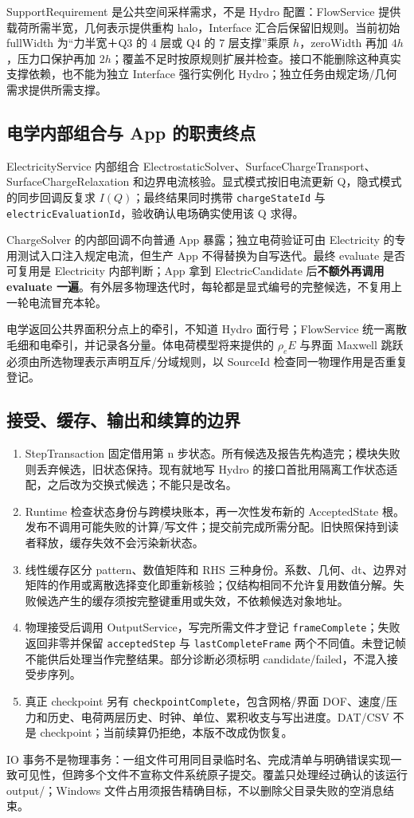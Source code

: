 \documentclass[UTF8,a4paper,11pt,fontset=fandol]{ctexart}
\numberwithin{equation}{section}
\newcommand{\code}[1]{\nolinkurl{#1}}
\begin{document}
SupportRequirement 是公共空间采样需求，不是 Hydro 配置：FlowService 提供载荷所需半宽，几何表示提供重构 halo，Interface 汇合后保留旧规则。当前初始 fullWidth 为“力半宽＋Q3 的 4 层或 Q4 的 7 层支撑”乘原 $h$，zeroWidth 再加 $4h$，压力口保护再加 $2h$；覆盖不足时按原规则扩展并检查。接口不能删除这种真实支撑依赖，也不能为独立 Interface 强行实例化 Hydro；独立任务由规定场/几何需求提供所需支撑。

\subsection{电学内部组合与 App 的职责终点}
ElectricityService 内部组合 ElectrostaticSolver、SurfaceChargeTransport、SurfaceChargeRelaxation 和边界电流核验。显式模式按旧电流更新 Q，隐式模式的同步回调反复求 $I(Q)$；最终结果同时携带 \code{chargeStateId} 与 \code{electricEvaluationId}，验收确认电场确实使用该 Q 求得。

ChargeSolver 的内部回调不向普通 App 暴露；独立电荷验证可由 Electricity 的专用测试入口注入规定电流，但生产 App 不得替换为自写迭代。最终 evaluate 是否可复用是 Electricity 内部判断；App 拿到 ElectricCandidate 后\textbf{不额外再调用 evaluate 一遍}。有外层多物理迭代时，每轮都是显式编号的完整候选，不复用上一轮电流冒充本轮。

电学返回公共界面积分点上的牵引，不知道 Hydro 面行号；FlowService 统一离散毛细和电牵引，并记录各分量。体电荷模型将来提供的 $\rho_e E$ 与界面 Maxwell 跳跃必须由所选物理表示声明互斥/分域规则，以 SourceId 检查同一物理作用是否重复登记。

\subsection{接受、缓存、输出和续算的边界}
\begin{enumerate}
\item StepTransaction 固定借用第 n 步状态。所有候选及报告先构造完；模块失败则丢弃候选，旧状态保持。现有就地写 Hydro 的接口首批用隔离工作状态适配，之后改为交换式候选；不能只是改名。
\item Runtime 检查状态身份与跨模块账本，再一次性发布新的 AcceptedState 根。发布不调用可能失败的计算/写文件；提交前完成所需分配。旧快照保持到读者释放，缓存失效不会污染新状态。
\item 线性缓存区分 pattern、数值矩阵和 RHS 三种身份。系数、几何、dt、边界对矩阵的作用或离散选择变化即重新核验；仅结构相同不允许复用数值分解。失败候选产生的缓存须按完整键重用或失效，不依赖候选对象地址。
\item 物理接受后调用 OutputService，写完所需文件才登记 \code{frameComplete}；失败返回非零并保留 \code{acceptedStep} 与 \code{lastCompleteFrame} 两个不同值。未登记帧不能供后处理当作完整结果。部分诊断必须标明 candidate/failed，不混入接受步序列。
\item 真正 checkpoint 另有 \code{checkpointComplete}，包含网格/界面 DOF、速度/压力和历史、电荷两层历史、时钟、单位、累积收支与写出进度。DAT/CSV 不是 checkpoint；当前续算仍拒绝，本版不改成伪恢复。
\end{enumerate}
IO 事务不是物理事务：一组文件可用同目录临时名、完成清单与明确错误实现一致可见性，但跨多个文件不宣称文件系统原子提交。覆盖只处理经过确认的该运行 output/；Windows 文件占用须报告精确目标，不以删除父目录失败的空消息结束。
\end{document}

